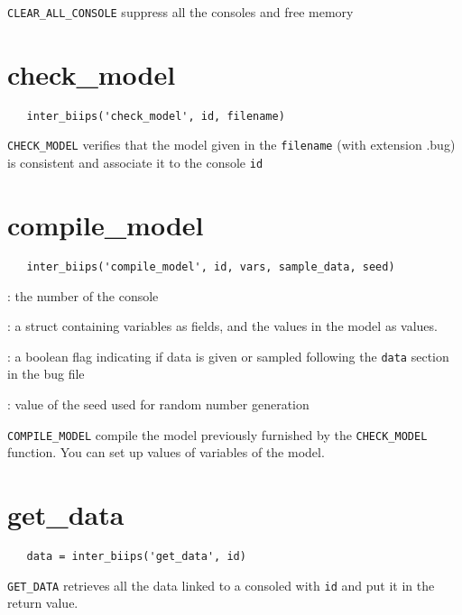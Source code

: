 \documentclass[11pt]{article}
\begin{document}
  \texttt{CLEAR\_ALL\_CONSOLE} suppress all the consoles and free memory

\section{check\_model}

 \begin{lstlisting}
   inter_biips('check_model', id, filename)
 \end{lstlisting}
  
 \texttt{CHECK\_MODEL} verifies that the model given in the \texttt{filename} (with extension .bug) is consistent and associate it to the console \texttt{id}

\section{compile\_model}

 \begin{lstlisting}
   inter_biips('compile_model', id, vars, sample_data, seed) 
 \end{lstlisting}
   \begin{description}
   \setlength{\baselineskip}{0.1\baselineskip}
     \item[\texttt{id}]: the number of the console
     \item[\texttt{vars}]: a struct containing variables as fields, and the values in the model as values.
     \item[\texttt{sample\_data}]: a boolean flag indicating if data is given or sampled following the \texttt{data} section in the bug file
     \item[\texttt{seed}]: value of the seed used for random number generation
   
   \end{description}

   \texttt{COMPILE\_MODEL} compile the model previously furnished by the \texttt{CHECK\_MODEL} function. You can set up values of variables of 
   the model.


\section{get\_data}
   
 \begin{lstlisting}
   data = inter_biips('get_data', id) 
 \end{lstlisting}
 
  \texttt{GET\_DATA} retrieves all the data linked to a consoled with \texttt{id} and put it in the return value.
\end{document}
